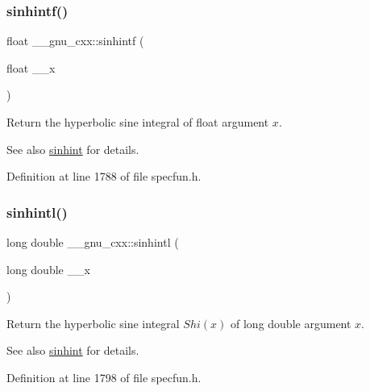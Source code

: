 \subsubsection{\texorpdfstring{sinhintf()}{sinhintf()}}
{\footnotesize\ttfamily float \+\_\+\+\_\+gnu\+\_\+cxx\+::sinhintf (\begin{DoxyParamCaption}\item[{float}]{\+\_\+\+\_\+x }\end{DoxyParamCaption})\hspace{0.3cm}{\ttfamily [inline]}}

Return the hyperbolic sine integral of {\ttfamily float} argument $ x $.

\begin{DoxySeeAlso}{See also}
\hyperlink{group__gnu__math__spec__func_gab5cbc831c5fab99a967c03d059f1ad59}{sinhint} for details. 
\end{DoxySeeAlso}


Definition at line 1788 of file specfun.\+h.

\mbox{\label{group__gnu__math__spec__func_ga8b7f1a070be7233a3179e3cbded387ee}} 
\subsubsection{\texorpdfstring{sinhintl()}{sinhintl()}}
{\footnotesize\ttfamily long double \+\_\+\+\_\+gnu\+\_\+cxx\+::sinhintl (\begin{DoxyParamCaption}\item[{long double}]{\+\_\+\+\_\+x }\end{DoxyParamCaption})\hspace{0.3cm}{\ttfamily [inline]}}

Return the hyperbolic sine integral $ Shi(x) $ of {\ttfamily long double} argument $ x $.

\begin{DoxySeeAlso}{See also}
\hyperlink{group__gnu__math__spec__func_gab5cbc831c5fab99a967c03d059f1ad59}{sinhint} for details. 
\end{DoxySeeAlso}


Definition at line 1798 of file specfun.\+h.

\mbox{\label{group__gnu__math__spec__func_ga076c8d52588904f5711c41781f8acfa0}} 
